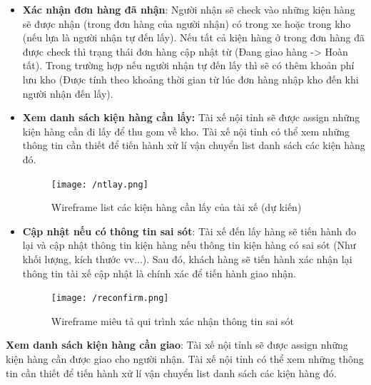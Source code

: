 \begin{itemize}
\begin{itemize}
		\item \textbf{Xác nhận đơn hàng đã nhận}: Người nhận sẽ check vào những kiện hàng sẽ được nhận (trong đơn hàng của người nhận) có trong xe hoặc trong kho (nếu lựa là người nhận tự đến lấy). Nếu tất cả kiện hàng ở trong đơn hàng đã được check thì trạng thái đơn hàng cập nhật từ (Đang giao hàng -> Hoàn tất). Trong trường hợp nếu người nhận tự đến lấy thì sẽ có thêm khoản phí lưu kho (Được tính theo khoảng thời gian từ lúc đơn hàng nhập kho đến khi người nhận đến lấy).
	\end{itemize}
	
	\begin{itemize}
		\item \textbf{Xem danh sách kiện hàng cần lấy:} Tài xế nội tỉnh sẽ được assign những kiện hàng cần đi lấy để thu gom về kho. Tài xế nội tỉnh có thể xem những thông tin cần thiết để tiến hành xử lí vận chuyển list danh sách các kiện hàng đó.
		
		\begin{figure}[!ht]
			\texttt{[image: /ntlay.png]}
			\centering
			\linebreak
			\caption{Wireframe list các kiện hàng cần lấy của tài xế (dự kiến)}
		\end{figure}
		
		\item \textbf{Cập nhật nếu có thông tin sai sót}: Tài xế đến lấy hàng sẽ tiến hành đo lại và cập nhật thông tin kiện hàng nếu thông tin kiện hàng có sai sót (Như khối lượng, kích thước vv...). Sau đó, khách hàng sẽ tiến hành xác nhận lại thông tin tài xế cập nhật là chính xác để tiến hành giao nhận.
		
		\newpage
		
		\begin{figure}[!ht]
			\texttt{[image: /reconfirm.png]}
			\centering
			\linebreak
			\caption{Wireframe miêu tả qui trình xác nhận thông tin sai sót}
		\end{figure}
	\end{itemize}
	
	\textbf{Xem danh sách kiện hàng cần giao}:  Tài xế nội tỉnh sẽ được assign những kiện hàng cần được giao cho người nhận. Tài xế nội tỉnh có thể xem những thông tin cần thiết để tiến hành xử lí vận chuyển list danh sách các kiện hàng đó.
	

\end{itemize}
